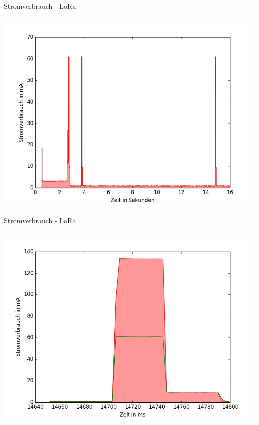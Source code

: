 \documentclass[18pt]{beamer}
\begin{document}
\begin{frame}{Stromverbrauch - LoRa}
	\begin{minipage}[c][\textheight][t]{\textwidth}
		\centering
		\includegraphics[height=0.85\textheight]{plots/lora5.png}
	\end{minipage}
\end{frame}

\begin{frame}{Stromverbrauch - LoRa}
	\begin{minipage}[c][\textheight][t]{\textwidth}
		\centering
		\includegraphics[height=0.85\textheight]{plots/lora235send.png}
	\end{minipage}
\end{frame}
\end{document}
